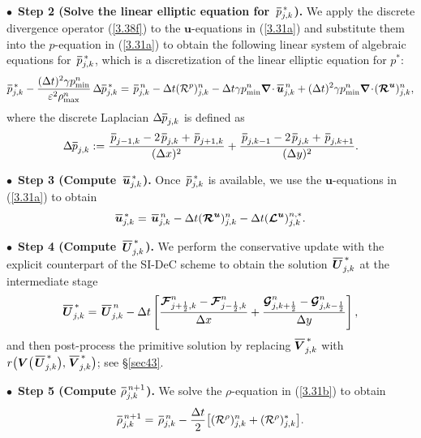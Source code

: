 \documentclass[A4paper,12pt,twoside]{article}
\numberwithin{equation}{section}
\numberwithin{figure}{section}
\numberwithin{table}{section}
\def\bnabla{\bm{\nabla}}
\newcommand{\dt}{\Delta t}
\newcommand{\dx}{\Delta x}
\newcommand{\dy}{\Delta y}
\newcommand{\kph}{{k+\frac{1}{2}}}
\newcommand{\kmh}{{k-\frac{1}{2}}}
\newcommand{\jph}{{j+\frac{1}{2}}}
\newcommand{\jmh}{{j-\frac{1}{2}}}
\newcommand{\ve}{\varepsilon}
\newcommand\eref[1]{(\ref{#1})}
\newcommand*\xbar[1]{%
  \hbox{%
    \vbox{%
      \hrule height 0.5pt %
      \kern0.4ex%
      \hbox{%
        \kern-0.05em%
        \ensuremath{#1}%
        \kern-0.00em%
      }%
    }%
  }%
}
\begin{document}
\smallskip
\noindent
$\bullet\,$ \textbf{Step 2 (Solve the linear elliptic equation for $\,\xbar p^{\,*}_{j,k}$).} We apply the discrete divergence operator
\eref{3.38f} to the $\bm u$-equations  in \eref{3.31a} and substitute them into the $p$-equation in \eref{3.31a} to obtain the following
linear system of algebraic equations for $\,\xbar p^{\,*}_{j,k}$, which is a discretization of the linear elliptic equation for $p^*$:
\begin{equation*}
\xbar p^{\,*}_{j,k}-\frac{(\dt)^2\gamma p_{\min}^n}{\ve^2\rho_{\max}^n}\,\Delta\xbar p_{j,k}^{\,*}=\,\xbar p^{\,n}_{j,k}-
\dt({\cal R}^p)^n_{j,k}-\dt\gamma p_{\min}^n\bnabla\!\cdot\xbar{\bm u}_{j,k}^{\,n}
+(\dt)^2\gamma p_{\min}^n\bnabla\!\cdot\!(\bm{{\cal R}}^{\bm u})^n_{j,k},
\label{3.39f}
\end{equation*}
where the discrete Laplacian $\Delta\xbar p_{j,k}$ is defined as
$$
\Delta\xbar p_{j,k}:=\frac{\,\xbar p_{j-1,k}-2\,\xbar p_{j,k}+\,\xbar p_{j+1,k}}{(\dx)^2}+
\frac{\,\xbar p_{j,k-1}-2\,\xbar p_{j,k}+\,\xbar p_{j,k+1}}{(\dy)^2}.
$$

\smallskip
\noindent
$\bullet\,$ \textbf{Step 3 (Compute $\,\xbar{\bm u}^{\,*}_{j,k}$).} Once $\,\xbar p^{\,*}_{j,k}$ is available, we use the $\bm u$-equations
in \eref{3.31a} to obtain
\begin{equation*}
\xbar{\bm u}^{\,*}_{j,k}=\,\xbar{\bm u}^{\,n}_{j,k}-\dt(\bm{{\cal R}}^{\bm u})^n_{j,k}-\dt(\bm{{\cal L}}^{\bm u})^{n,*}_{j,k}.
\end{equation*}

\smallskip
\noindent
$\bullet\,$ \textbf{Step 4 (Compute $\,\xbar{\bm U}^{\,*}_{j,k}$).} 
We perform the conservative update with the explicit counterpart of the SI-DeC scheme to obtain the solution $\,\xbar{\bm U}^{\,*}_{j,k}$ 
at the intermediate stage
\begin{equation}
\xbar{\bm U}^{\,*}_{j,k}=\,\xbar{\bm U}^{\,n}_{j,k}-\dt\left[\frac{\bm{{\cal F}}_{\jph,k}^n-\bm{{\cal F}}_{\jmh,k}^n}{\dx}+
\frac{\bm{{\cal G}}_{j,\kph}^n-\bm{{\cal G}}_{j,\kmh}^n}{\dy}\right],
\label{3.50}
\end{equation}
and then post-process the primitive solution by replacing $\xbar{\bm V}^{\,*}_{j,k}$ with
$r\big(\bm V\big(\,\xbar{\bm U}^{\,*}_{j,k}\big),\,\xbar{\bm V}^{\,*}_{j,k}\big)$; see \S\ref{sec43}.

\smallskip
\noindent
$\bullet\,$ \textbf{Step 5 (Compute $\xbar\rho^{\,n+1}_{j,k}$).} We solve the $\rho$-equation in \eref{3.31b} to obtain
\begin{equation*}
\xbar\rho^{\,n+1}_{j,k}=\,\xbar\rho^{\,n}_{j,k}-\frac{\dt}{2}\big[({\cal R}^\rho)^n_{j,k}+({\cal R}^\rho)^*_{j,k}\big].
\end{equation*}
\end{document}
